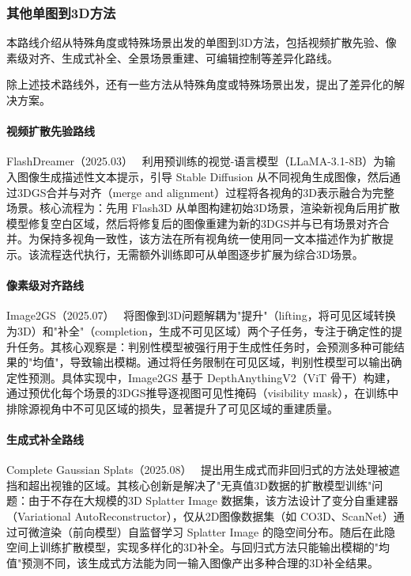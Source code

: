 \subsubsection{其他单图到3D方法}
\label{sec:08_2_1_5}

本路线介绍从特殊角度或特殊场景出发的单图到3D方法，包括视频扩散先验、像素级对齐、生成式补全、全景场景重建、可编辑控制等差异化路线。

除上述技术路线外，还有一些方法从特殊角度或特殊场景出发，提出了差异化的解决方案。

\paragraph{视频扩散先验路线} FlashDreamer（2025.03）~\cite{2503_00726} 利用预训练的视觉-语言模型（LLaMA-3.1-8B）为输入图像生成描述性文本提示，引导 Stable Diffusion 从不同视角生成图像，然后通过3DGS合并与对齐（merge and alignment）过程将各视角的3D表示融合为完整场景。核心流程为：先用 Flash3D 从单图构建初始3D场景，渲染新视角后用扩散模型修复空白区域，然后将修复后的图像重建为新的3DGS并与已有场景对齐合并。为保持多视角一致性，该方法在所有视角统一使用同一文本描述作为扩散提示。该流程迭代执行，无需额外训练即可从单图逐步扩展为综合3D场景。

\paragraph{像素级对齐路线} Image2GS（2025.07）~\cite{2507_00916} 将图像到3D问题解耦为"提升"（lifting，将可见区域转换为3D）和"补全"（completion，生成不可见区域）两个子任务，专注于确定性的提升任务。其核心观察是：判别性模型被强行用于生成性任务时，会预测多种可能结果的"均值"，导致输出模糊。通过将任务限制在可见区域，判别性模型可以输出确定性预测。具体实现中，Image2GS 基于 DepthAnythingV2（ViT 骨干）构建，通过预优化每个场景的3DGS推导逐视图可见性掩码（visibility mask），在训练中排除源视角中不可见区域的损失，显著提升了可见区域的重建质量。

\paragraph{生成式补全路线} Complete Gaussian Splats（2025.08）~\cite{2508_21542} 提出用生成式而非回归式的方法处理被遮挡和超出视锥的区域。其核心创新是解决了"无真值3D数据的扩散模型训练"问题：由于不存在大规模的3D Splatter Image 数据集，该方法设计了变分自重建器（Variational AutoReconstructor），仅从2D图像数据集（如 CO3D、ScanNet）通过可微渲染（前向模型）自监督学习 Splatter Image 的隐空间分布。随后在此隐空间上训练扩散模型，实现多样化的3D补全。与回归式方法只能输出模糊的"均值"预测不同，该生成式方法能为同一输入图像产出多种合理的3D补全结果。


